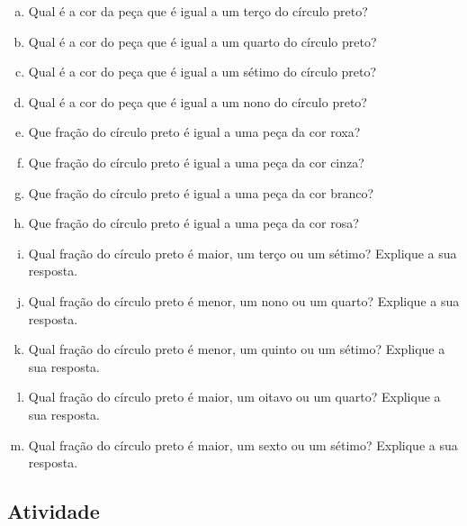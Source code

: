 \begin{enumerate}[a)]
   \item  Qual é a cor da peça que é igual a um terço do círculo preto?
  \item  Qual é a cor do peça que é igual a um quarto do círculo preto?
  \item  Qual é  a cor do peça que é igual a um sétimo do círculo preto?
  \item  Qual é a cor do peça que é igual a um nono do círculo preto?
  \item  Que fração do círculo preto é igual a uma peça da cor roxa?
  \item  Que fração do círculo preto é igual a uma peça da cor cinza?
  \item  Que fração do círculo preto é igual a uma peça da cor branco?
  \item  Que fração do círculo preto é igual a uma peça da cor rosa?
  \item  Qual fração do círculo preto é maior, um terço ou um sétimo? Explique a sua resposta.
  \item  Qual fração do círculo preto é menor, um nono ou um quarto? Explique a sua resposta.
  \item  Qual fração do círculo preto é menor, um quinto ou um sétimo? Explique a sua resposta.
  \item  Qual fração do círculo preto é maior, um oitavo ou um quarto? Explique a sua resposta.
  \item  Qual fração do círculo preto é maior, um sexto ou um sétimo? Explique a sua resposta.
\end{enumerate}

\subsection{Atividade}

